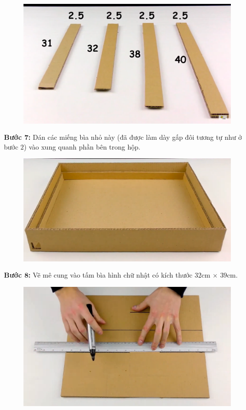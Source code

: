 \begin{multicols}{2}
	\begin{figure}[H]
		\vspace*{-5pt}
		\centering
		\captionsetup{labelformat= empty, justification=centering}
		\includegraphics[width= 0.9\linewidth]{10}
		\vspace*{-10pt}
	\end{figure}
	\textbf{\color{toancuabi}Bước $\pmb{7}$:} Dán các miếng bìa nhỏ này (đã được làm dày gấp đôi tương tự như ở bước $2$) vào xung quanh phần bên trong hộp.
	\begin{figure}[H]
		\vspace*{-5pt}
		\centering
		\captionsetup{labelformat= empty, justification=centering}
		\includegraphics[width= 0.9\linewidth]{11}
		\vspace*{-10pt}
	\end{figure}
	\textbf{\color{toancuabi}Bước $\pmb{8}$:} Vẽ mê cung vào tấm bìa hình chữ nhật có kích thước $32$cm $\times$ $39$cm.
	\begin{figure}[H]
		\vspace*{-5pt}
		\centering
		\captionsetup{labelformat= empty, justification=centering}
		\includegraphics[width= 0.9\linewidth]{12}

\end{figure}
\end{multicols}

